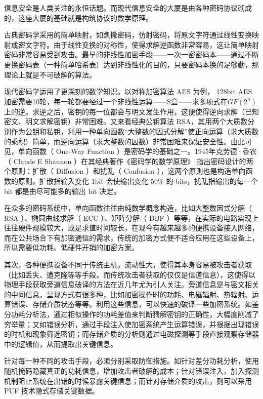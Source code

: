 
信息安全是人类关注的永恒话题。而现代信息安全的大厦是由各种密码协议砌成的，这座大厦的基础就是构筑协议的数学原理。

古典密码学采用的简单映射，如凯撒密码，仿射密码，将原文字符通过线性变换映射成密文字符。由于线性变换的对称性，使得求解逆函数非常容易，这让简单映射密码非常容易受到攻击。最早的非线性加密手段——一次一密密码本——通过不断更换密码表（一种简单哈希表）达到非线性化的目的，只要密码本换的足够勤，那理论上就是不可破解的算法。

现代密码学运用了更深刻的数学知识。以对称加密算法 AES 为例， 128bit AES 加密需要10轮，每一轮都要经过一个非线性运算——S盒——求多项式在$GF(2^n)$上的逆。求逆之后，密钥的每一位都会与明文发生作用，这便使得逆向求解（已知密文、明文求解密钥）非常困难。又来看经典公钥算法 RSA，其用两个大质数分别作为公钥和私钥，利用一种单向函数``大整数的因式分解''使正向运算（求大质数的乘积）简单，而逆向运算（求大整数的因数）非常困难来保证安全性。由此可见，单向函数（ One-Way Function ）是密码学的基础之一。1945年克劳德·香农（ Claude E Shannon ）在其经典著作《密码学的数学原理》\supercite{shannon1945mathematical} 指出密码设计的两个原则：扩散（ Diffusion ）和扰乱（ Confusion ），这两个原则也是构造单向函数的原则。扩散指输入变化 1bit 会使输出变化 50\% 的 bits，扰乱指输出的每一个 bit 都是由尽可能多的输出 bit 决定。

在众多的密码系统中，单向函数往往由纯数学概念构造，比如大整数因式分解（ RSA ）、椭圆曲线求解（ ECC ）、矩阵分解\supercite{wendt2013bidirectional}（ DBF ）等等，在实际的电路实现上往往硬件规模较大，或是求值时间较长，在现今有越来越多的便携设备接入网络，而在公共场合下有加密通信的需求，传统的加密方式便不适合应用在这些设备上，所以需要低功耗、低硬件开销的加密方案。

其次，各种便携设备不同于传统主机，流动性大，使得其本身容易被攻击者获取（比如丢失、遭克隆等等手段，而传统攻击者获取的仅仅是信道信息），这使得以物理手段获取旁道信息破译的方法在近几年尤为引人关注。旁道信息是与密文相关的中间信息，呈现方式有很多种，比如加密操作时的功耗、电磁辐射、热辐射、运算错误、存储介质状态等等。利用这些信息，可以快速的破译一些加密系统。如差分功耗分析法，通过相似操作的功耗差值来判断猜解密钥的正确性，大幅度削减了穷举量；又如错误分析，通过手段注入使加密系统产生运算错误，并根据出现错误的时机和现象筛选密钥；而存储介质的分析则通过电磁探测等手段直接观察存储器中的逻辑值，从而提取出关键信息。

针对每一种不同的攻击手段，必须分别采取防御措施。如针对差分功耗分析，使用随机掩码隐藏真正的功耗信息，增加攻击者破解的成本；针对错误注入，加入探测机制阻止系统在出错的时候暴露关键信息；而针对存储介质的攻击，则可以采用 PUF 技术隐式存储关键数据。

